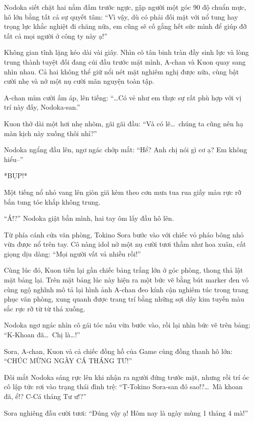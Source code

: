 \documentclass[../main.tex]{subfiles}
\begin{document}
Nodoka siết chặt hai nắm đấm trước ngực, gập người một góc 90 độ chuẩn mực, hô lớn bằng tất cả sự quyết tâm: ``Vì vậy, dù có phải đối mặt với nổ tung hay trọng lực khắc nghiệt đi chăng nữa, em cũng sẽ cố gắng hết sức mình để giúp đỡ tất cả mọi người ở công ty này ạ!''

Không gian tĩnh lặng kéo dài vài giây. Nhìn cô tân binh tràn đầy sinh lực và lòng trung thành tuyệt đối đang cúi đầu trước mặt mình, A-chan và Kuon quay sang nhìn nhau. Cả hai không thể giữ nổi nét mặt nghiêm nghị được nữa, cùng bật cười nhẹ và nở một nụ cười mãn nguyện toàn tập.

A-chan mỉm cười ấm áp, lên tiếng: ``\dots Có vẻ như em thực sự rất phù hợp với vị trí này đấy, Nodoka-san.''

Kuon thở dài một hơi nhẹ nhõm, gãi gãi đầu: ``Và có lẽ\dots\ chúng ta cũng nên hạ màn kịch này xuống thôi nhỉ?''

Nodoka ngẩng đầu lên, ngơ ngác chớp mắt: ``Hể? Anh chị nói gì cơ ạ? Em không hiểu--''

*BỤP!*

Một tiếng nổ nhỏ vang lên giòn giã kèm theo cơn mưa tua rua giấy màu rực rỡ bắn tung tóe khắp không trung.

``Á!?'' Nodoka giật bắn mình, hai tay ôm lấy đầu hô lên.

Từ phía cánh cửa văn phòng, Tokino Sora bước vào với chiếc vỏ pháo bông nhỏ vừa được nổ trên tay. Cô nàng idol nở một nụ cười tươi thắm như hoa xuân, cất giọng dịu dàng: ``Mọi người vất vả nhiều rồi!''

Cùng lúc đó, Kuon tiến lại gần chiếc bảng trắng lớn ở góc phòng, thong thả lật mặt bảng lại. Trên mặt bảng lúc này hiện ra một bức vẽ bằng bút marker đen vô cùng ngộ nghĩnh mô tả lại hình ảnh A-chan đeo kính cận nghiêm túc trong trang phục văn phòng, xung quanh được trang trí bằng những sợi dây kim tuyến màu sắc rực rỡ từ từ thả xuống.

Nodoka ngơ ngác nhìn cô gái tóc nâu vừa bước vào, rồi lại nhìn bức vẽ trên bảng: ``K-Khoan đã\dots\ Chị là\dots!''

Sora, A-chan, Kuon và cả chiếc đồng hồ của Game cùng đồng thanh hô lớn: ``CHÚC MỪNG NGÀY CÁ THÁNG TƯ!''

Đôi mắt Nodoka sáng rực lên khi nhận ra người đứng trước mặt, nhưng rồi trí óc cô lập tức rơi vào trạng thái đình trệ: ``T-Tokino Sora-san đó sao!?\dots\ Mà khoan đã, ể!? C-Cá tháng Tư ư!?''

Sora nghiêng đầu cười tươi: ``Đúng vậy ạ! Hôm nay là ngày mùng 1 tháng 4 mà!''
\end{document}
